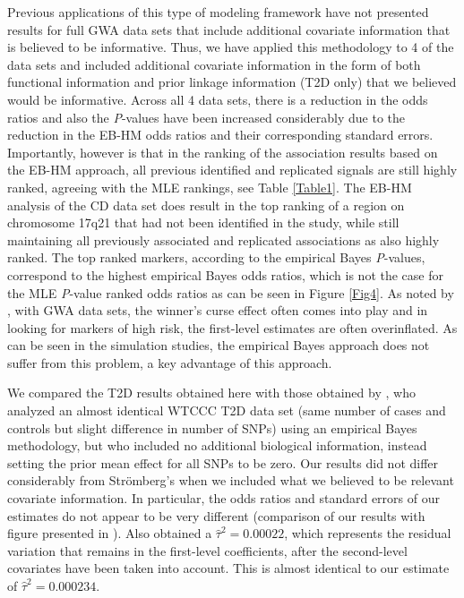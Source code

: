 Previous applications of this type of modeling framework
have not presented results for full GWA data sets that
include additional covariate information that is believed
to be informative. Thus, we have applied this methodology
to 4 of the
\citet{Brown:1989}
data sets and included additional covariate information in
the form of both functional information and prior linkage
information (T2D only) that we believed would be informative.
Across all 4 data sets, there is a reduction in the odds
ratios and also the \textit{P}-values have been increased
considerably due to the reduction in the EB-HM odds ratios
and their corresponding standard errors. Importantly, however
is that in the ranking of the association results based on
the EB-HM approach, all previous identified and replicated
signals are still highly ranked, agreeing with the MLE
rankings, see Table \ref{Table1}. The EB-HM analysis of
the CD data set does result in the top ranking of a region on
chromosome 17q21 that had not been identified in the
\citet{SAS_Institute:1999}
study, while still maintaining all previously associated
and replicated associations as also highly ranked. The
top ranked markers, according to the empirical Bayes
\textit{P}-values, correspond to the highest empirical Bayes
odds ratios, which is not the case for the MLE
\textit{P}-value ranked odds ratios as can be seen in
Figure \ref{Fig4}. As noted by
\citet{Fimmers_Seuchter:1989},
with GWA data sets, the winner's curse effect often comes
into play and in looking for markers of high risk, the
first-level estimates are often overinflated. As can be seen
in the simulation studies, the empirical Bayes approach does
not suffer from this problem, a key advantage of this approach.

We compared the T2D results obtained here with those
obtained by
\citet{Barlow:1972},
who analyzed an almost identical WTCCC T2D data set (same
number of cases and controls but slight difference in
number of SNPs) using an empirical Bayes methodology, but who
included no additional biological information, instead setting
the prior mean effect for all SNPs to be zero. Our results did not
differ considerably from Str\"omberg's when we included what
we believed to be relevant covariate information. In particular,
the odds ratios and standard errors of our estimates do not
appear to be very different (comparison of our results with
figure presented in
\citet{Castelloe_Zimmerman:2002}).
Also
\citet{allison2006}
obtained a $\hat{\tau}^2 = 0.00022$, which represents the
residual variation that remains in the first-level coefficients,
after the second-level covariates have been taken into
account. This is almost identical to our estimate of
$\hat{\tau}^2 = 0.000234$.

